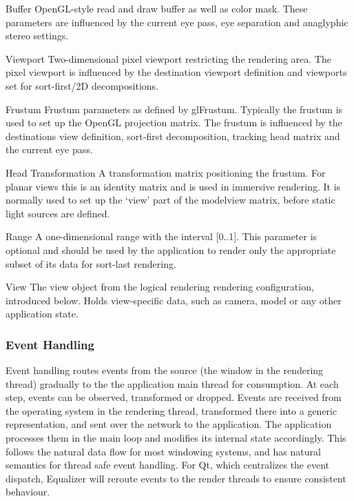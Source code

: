 \begin{compactdesc}

 \item[Buffer] OpenGL-style read and draw buffer as well as color mask. These
 parameters are influenced by the current eye pass, eye separation and
 anaglyphic stereo settings.

 \item[Viewport] Two-dimensional pixel viewport restricting the rendering area.
 The pixel viewport is influenced by the destination viewport definition and
 viewports set for sort-first/2D decompositions.

 \item[Frustum] Frustum parameters as defined by \textsf{glFrustum}. Typically
 the frustum is used to set up the OpenGL projection matrix. The frustum is
 influenced by the destinations view definition, sort-first decomposition,
 tracking head matrix and the current eye pass.

 \item[Head Transformation] A transformation matrix positioning the frustum. For
 planar views this is an identity matrix and is used in immersive rendering.
 It is normally used to set up the `view' part of the modelview matrix, before
 static light sources are defined.
 \item[Range] A one-dimensional range with the interval [0..1]. This parameter is
 optional and should be used by the application to render only the appropriate
 subset of its data for sort-last rendering.

\item[View] The view object from the logical rendering rendering configuration,
introduced below. Holds view-specific data, such as camera, model or any other
application state.

\end{compactdesc}

\subsubsection{Event Handling}

Event handling routes events from the source (the window in the rendering
thread) gradually to the the application main thread for consumption. At each
step, events can be observed, transformed or dropped. Events are received from
the operating system in the rendering thread, transformed there into a generic
representation, and sent over the network to the application. The application
processes them in the main loop and modifies its internal state accordingly.
This follows the natural data flow for most windowing systems, and has natural
semantics for thread safe event handling. For Qt, which centralizes the event
dispatch, Equalizer will reroute events to the render threads to ensure
consistent behaviour.

